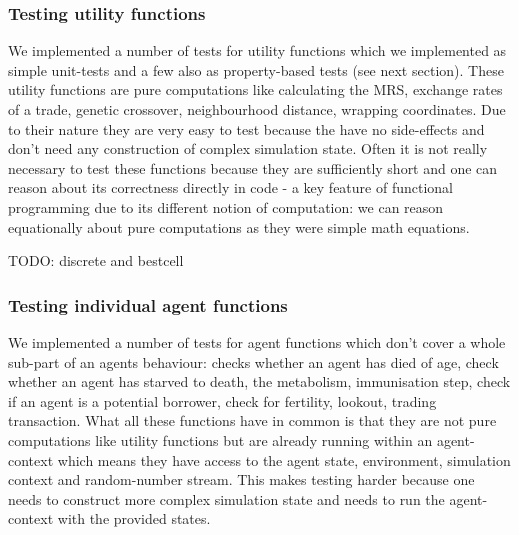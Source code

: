 \subsubsection{Testing utility functions}
We implemented a number of tests for utility functions which we implemented as simple unit-tests and a few also as property-based tests (see next section). These utility functions are pure computations like calculating the MRS, exchange rates of a trade, genetic crossover, neighbourhood distance, wrapping coordinates. Due to their nature they are very easy to test because the have no side-effects and don't need any construction of complex simulation state. Often it is not really necessary to test these functions because they are sufficiently short and one can reason about its correctness directly in code - a key feature of functional programming due to its different notion of computation: we can reason equationally about pure computations as they were simple math equations.

TODO: discrete and bestcell

\subsubsection{Testing individual agent functions}
We implemented a number of tests for agent functions which don't cover a whole sub-part of an agents behaviour: checks whether an agent has died of age, check whether an agent has starved to death, the metabolism, immunisation step, check if an agent is a potential borrower, check for fertility, lookout, trading transaction. What all these functions have in common is that they are not pure computations like utility functions but are already running within an agent-context which means they have access to the agent state, environment, simulation context and random-number stream. This makes testing harder because one needs to construct more complex simulation state and needs to run the agent-context with the provided states.


